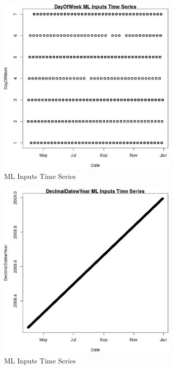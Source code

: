 \begin{figure} 
\centering  
\includegraphics[width=0.77\textwidth]{Code_Outputs/Report_ML_input_PM25_Step4_part_e_de_duplicated_aves_DayOfWeekvDate.jpg} 
\caption{\label{fig:Report_ML_input_PM25_Step4_part_e_de_duplicated_avesDayOfWeekvDate}ML Inputs Time Series} 
\end{figure} 
 

\begin{figure} 
\centering  
\includegraphics[width=0.77\textwidth]{Code_Outputs/Report_ML_input_PM25_Step4_part_e_de_duplicated_aves_DecimalDatewYearvDate.jpg} 
\caption{\label{fig:Report_ML_input_PM25_Step4_part_e_de_duplicated_avesDecimalDatewYearvDate}ML Inputs Time Series} 
\end{figure} 
 

